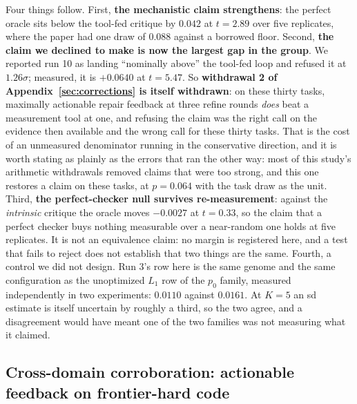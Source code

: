 \documentclass[11pt]{article}
\begin{document}
Four things follow. First, \textbf{the mechanistic claim strengthens}: the perfect oracle sits
below the tool-fed critique by $0.042$ at $t = 2.89$ over five replicates, where the paper had one draw of
$0.088$ against a borrowed floor. Second, \textbf{the claim we declined to make is now the largest
gap in the group}. We reported run 10 as landing ``nominally above'' the tool-fed loop and
refused it at $1.26\sigma$; measured, it is $+0.0640$ at $t = 5.47$. So
\textbf{withdrawal 2 of Appendix~\ref{sec:corrections} is itself withdrawn}: on these thirty
tasks, maximally actionable repair feedback at three refine rounds \emph{does} beat a measurement
tool at one, and refusing the claim was the
right call on the evidence then available and the wrong call for these thirty tasks. That is the
cost of an unmeasured denominator running in the conservative direction, and it is worth stating
as plainly as the errors that ran the other way: most of this study's arithmetic withdrawals
removed claims that were too strong, and this one restores a claim on these tasks, at
$p = 0.064$ with the task draw as the unit.
Third, \textbf{the perfect-checker null survives re-measurement}: against the \emph{intrinsic}
critique the oracle moves $-0.0027$ at $t = 0.33$, so the claim that a perfect checker buys
nothing measurable over a near-random one holds at five replicates. It is not an equivalence
claim: no margin is registered here, and a test that fails to reject does not establish that two
things are the same. Fourth, a control we did not design. Run 3's row
here is the same genome and the same configuration as the unoptimized $L_1$ row of the $p_0$
family, measured independently in two experiments: $0.0110$ against $0.0161$. At $K=5$ an sd
estimate is itself uncertain by roughly a third, so the two agree, and a disagreement would have
meant one of the two families was not measuring what it claimed.

\subsection{Cross-domain corroboration: actionable feedback on frontier-hard code}
\label{sec:bcb}
\end{document}

